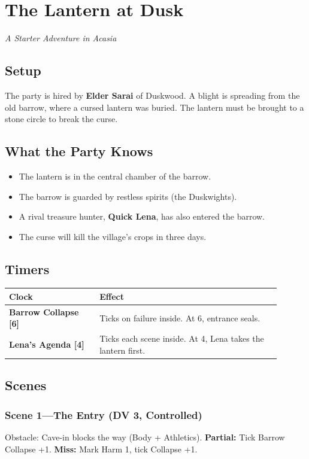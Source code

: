 \documentclass[10pt,twocolumn]{article} %
\begin{document}
\section{The Lantern at Dusk}
\textit{A Starter Adventure in Acasia}

\subsection{Setup}
The party is hired by \textbf{Elder Sarai} of Duskwood. A blight is spreading from the old barrow, where a cursed lantern was buried. The lantern must be brought to a stone circle to break the curse.

\subsection{What the Party Knows}
\begin{itemize}[leftmargin=*]
    \item The lantern is in the central chamber of the barrow.
    \item The barrow is guarded by restless spirits (the Duskwights).
    \item A rival treasure hunter, \textbf{Quick Lena}, has also entered the barrow.
    \item The curse will kill the village's crops in three days.
\end{itemize}

\subsection{Timers}
\begin{coretable}
\begin{tabular}{>{\bfseries}p{0.3\linewidth} p{0.6\linewidth}}
\toprule
\textbf{Clock} & \textbf{Effect} \\
\midrule
Barrow Collapse [6] & Ticks on failure inside. At 6, entrance seals. \\
Lena's Agenda [4] & Ticks each scene inside. At 4, Lena takes the lantern first. \\
\bottomrule
\end{tabular}
\end{coretable}

\subsection{Scenes}
\subsubsection{Scene 1---The Entry (DV 3, Controlled)}
Obstacle: Cave-in blocks the way (Body + Athletics). \textbf{Partial:} Tick Barrow Collapse +1. \textbf{Miss:} Mark Harm 1, tick Collapse +1.
\end{document}
